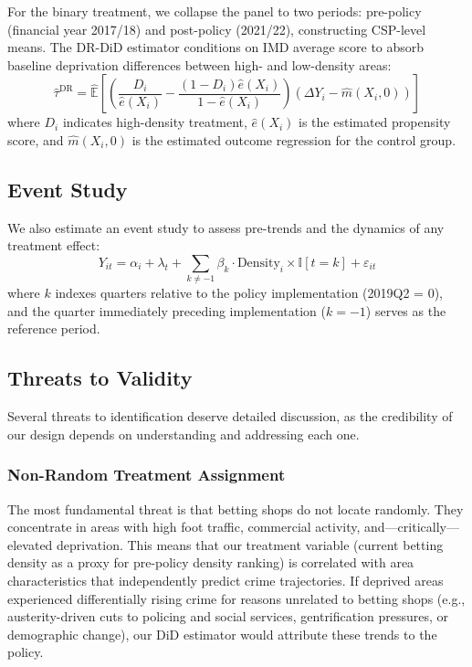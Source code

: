 \documentclass[12pt]{article}
\newcommand{\E}{\mathbb{E}}
\newcommand{\ind}{\mathbb{I}}
\begin{document}
For the binary treatment, we collapse the panel to two periods: pre-policy (financial year 2017/18) and post-policy (2021/22), constructing CSP-level means. The DR-DiD estimator conditions on IMD average score to absorb baseline deprivation differences between high- and low-density areas:
\begin{equation}
\hat{\tau}^{\text{DR}} = \hat{\E}\left[\left(\frac{D_i}{\hat{e}(X_i)} - \frac{(1-D_i)\hat{e}(X_i)}{1-\hat{e}(X_i)}\right) \left(\Delta Y_i - \hat{m}(X_i, 0)\right)\right]
\end{equation}
where $D_i$ indicates high-density treatment, $\hat{e}(X_i)$ is the estimated propensity score, and $\hat{m}(X_i, 0)$ is the estimated outcome regression for the control group.

\subsection{Event Study}

We also estimate an event study to assess pre-trends and the dynamics of any treatment effect:
\begin{equation}
Y_{it} = \alpha_i + \lambda_t + \sum_{k \neq -1} \beta_k \cdot \text{Density}_i \times \ind[t = k] + \varepsilon_{it}
\label{eq:eventstudy}
\end{equation}
where $k$ indexes quarters relative to the policy implementation (2019Q2 = 0), and the quarter immediately preceding implementation ($k = -1$) serves as the reference period.

\subsection{Threats to Validity}

Several threats to identification deserve detailed discussion, as the credibility of our design depends on understanding and addressing each one.

\subsubsection{Non-Random Treatment Assignment}

The most fundamental threat is that betting shops do not locate randomly. They concentrate in areas with high foot traffic, commercial activity, and---critically---elevated deprivation. This means that our treatment variable (current betting density as a proxy for pre-policy density ranking) is correlated with area characteristics that independently predict crime trajectories. If deprived areas experienced differentially rising crime for reasons unrelated to betting shops (e.g., austerity-driven cuts to policing and social services, gentrification pressures, or demographic change), our DiD estimator would attribute these trends to the policy.
\end{document}

